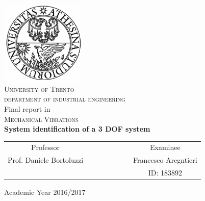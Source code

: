 \begin{titlepage}
 \begin{center}
 \includegraphics[width=4cm]{unitn.jpg}\\
 \vspace{1.5em}
 {\Large \textsc{University of Trento}}\\
 \vspace{1.5em}
 {\Large \textsc{department of industrial engineering}}\\
 \vspace{4em}
 {\normalsize Final report in}\\
 \vspace{1.5em}
 {\Large \textsc{Mechanical Vibrations}}\\
 \vspace{4em}
 {\LARGE\textbf{
 	System identification of a 3 DOF system
 }}\\
 \end{center}

\vskip 2.5cm
 \begin{center}
 \begin{tabular}{c c c c c c c c}
 Professor & & & & & & & Examinee\\[0.2cm]
 \large{Prof. Daniele Bortoluzzi} & & & & & & & \large{Francesco Aregntieri}\\[0.4cm]
  & & & & & & & ID: 183892\\[0.2cm]
 \end{tabular}
 \end{center}

\vskip 4cm
\begin{center}
{\normalsize Academic Year 2016/2017}
\end{center}
\end{titlepage}

\clearpage{\pagestyle{empty}\cleardoublepage}
